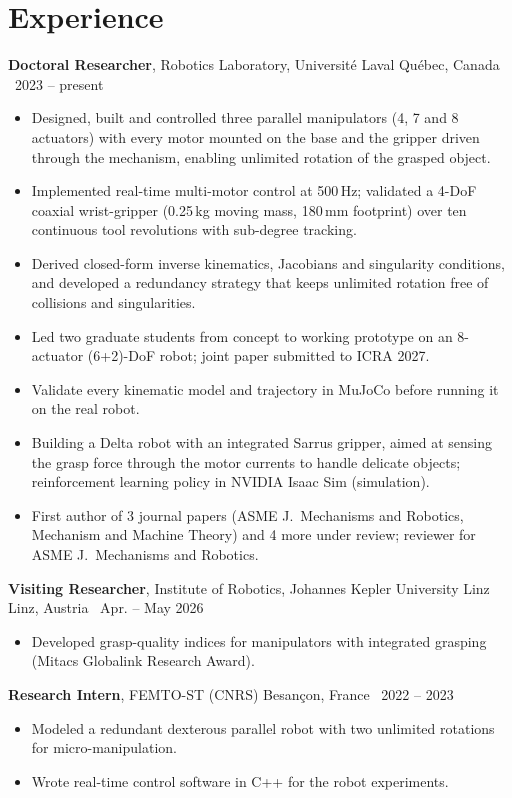 \documentclass[10pt,letterpaper]{article}
\newcommand{\role}[4]{\textbf{#1}, #2 \hfill {\color{muted}#3 \textbar\ #4}\par}
\begin{document}
\section{Experience}
\role{Doctoral Researcher}{Robotics Laboratory, Universit\'e Laval}{Qu\'ebec, Canada}{2023 -- present}
\begin{itemize}
\item Designed, built and controlled three parallel manipulators (4, 7 and 8 actuators) with every motor
mounted on the base and the gripper driven through the mechanism, enabling unlimited rotation of the grasped object.
\item Implemented real-time multi-motor control at 500\,Hz; validated a 4-DoF coaxial wrist-gripper (0.25\,kg moving mass,
180\,mm footprint) over ten continuous tool revolutions with sub-degree tracking.
\item Derived closed-form inverse kinematics, Jacobians and singularity conditions, and developed a redundancy
strategy that keeps unlimited rotation free of collisions and singularities.
\item Led two graduate students from concept to working prototype on an 8-actuator (6+2)-DoF robot; joint paper
submitted to ICRA 2027.
\item Validate every kinematic model and trajectory in MuJoCo before running it on the real robot.
\item Building a Delta robot with an integrated Sarrus gripper, aimed at sensing the grasp force through the motor
currents to handle delicate objects; reinforcement learning policy in NVIDIA Isaac Sim (simulation).
\item First author of 3 journal papers (ASME J.\ Mechanisms and Robotics, Mechanism and Machine Theory) and 4 more
under review; reviewer for ASME J.\ Mechanisms and Robotics.
\end{itemize}

\vspace{3pt}
\role{Visiting Researcher}{Institute of Robotics, Johannes Kepler University Linz}{Linz, Austria}{Apr. -- May 2026}
\begin{itemize}
\item Developed grasp-quality indices for manipulators with integrated grasping (Mitacs Globalink Research Award).
\end{itemize}

\vspace{3pt}
\role{Research Intern}{FEMTO-ST (CNRS)}{Besan\c{c}on, France}{2022 -- 2023}
\begin{itemize}
\item Modeled a redundant dexterous parallel robot with two unlimited rotations for micro-manipulation.
\item Wrote real-time control software in C++ for the robot experiments.
\end{itemize}
\end{document}
